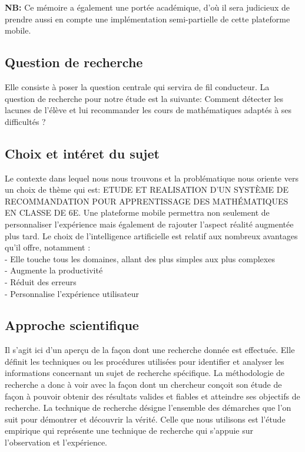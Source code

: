 \noindent

	\textbf{NB: } Ce mémoire a également une portée académique, d’où il sera judicieux de prendre aussi en compte une implémentation semi-partielle de cette plateforme mobile. 
\subsection{Question de recherche }
	Elle consiste à poser la question centrale qui servira de fil conducteur. La question de recherche pour notre étude est la suivante: Comment détecter les lacunes de l’élève et lui recommander les cours de mathématiques adaptés à ses difficultés ? 
\subsection{Choix et intéret du sujet }
	Le contexte dans lequel nous nous trouvons et la problématique nous oriente vers un choix de thème qui est: ETUDE ET REALISATION D’UN SYSTÈME DE RECOMMANDATION POUR APPRENTISSAGE DES MATHÉMATIQUES EN CLASSE DE 6E. Une plateforme mobile permettra non seulement de personnaliser l’expérience mais également de rajouter l’aspect réalité augmentée plus tard. Le choix de l’intelligence artificielle est relatif aux nombreux avantages qu’il offre, notamment : \\
	- Elle touche tous les domaines, allant des plus simples aux plus complexes \\
	- Augmente la productivité \\
	- Réduit des erreurs \\
	- Personnalise l'expérience utilisateur

\subsection{Approche scientifique}
	Il s’agit ici d’un aperçu de la façon dont une recherche donnée est effectuée. Elle définit les techniques ou les procédures utilisées pour identifier et analyser les informations concernant un sujet de recherche spécifique. La méthodologie de recherche a donc à voir avec la façon dont un chercheur conçoit son étude de façon à pouvoir obtenir des résultats valides et fiables et atteindre ses objectifs de recherche. La technique de recherche désigne l’ensemble des démarches que l’on suit pour démontrer et découvrir la vérité. Celle que nous utilisons est l’étude empirique qui représente une technique de recherche qui s’appuie sur l’observation et l’expérience.
	
